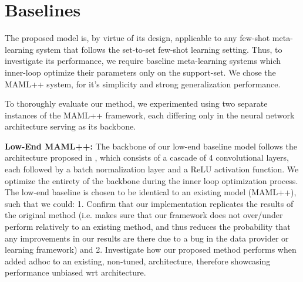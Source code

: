 \documentclass{article} \usepackage[dvipsnames]{xcolor}
\begin{document}
\section{Baselines}
The proposed model is, by virtue of its design, applicable to any few-shot meta-learning system that follows the set-to-set \cite{vinyals2016matching} few-shot learning setting. Thus, to investigate its performance, we require baseline meta-learning systems which inner-loop optimize their parameters only on the support-set. We chose the MAML++ system, for it's simplicity and strong generalization performance. 

To thoroughly evaluate our method, we experimented using two separate instances of the MAML++ framework, each differing only in the neural network architecture serving as its backbone. 

\textbf{Low-End MAML++:}
The backbone of our low-end baseline model follows the architecture proposed in \cite{antoniou2018train}, which consists of a cascade of 4 convolutional layers, each followed by a batch normalization layer and a ReLU activation function. We optimize the entirety of the backbone during the inner loop optimization process. The low-end baseline is chosen to be identical to an existing model (MAML++), such that we could: 1. Confirm that our implementation replicates the results of the original method (i.e. makes sure that our framework does not over/under perform relatively to an existing method, and thus reduces the probability that any improvements in our results are there due to a bug in the data provider or learning framework) and 2. Investigate how our proposed method performs when added adhoc to an existing, non-tuned, architecture, therefore showcasing performance unbiased wrt architecture.
\end{document}
